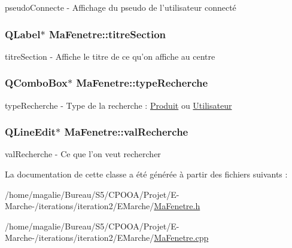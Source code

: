 pseudo\-Connecte -\/ Affichage du pseudo de l'utilisateur connecté 

\hypertarget{class_ma_fenetre_ac4749f9608f7c8d6e5d60434ddbedfc5}{
\subsubsection[{titre\-Section}]{\setlength{\rightskip}{0pt plus 5cm}Q\-Label$\ast$ Ma\-Fenetre\-::titre\-Section\hspace{0.3cm}{\ttfamily [protected]}}}\label{class_ma_fenetre_ac4749f9608f7c8d6e5d60434ddbedfc5}


titre\-Section -\/ Affiche le titre de ce qu'on affiche au centre 

\hypertarget{class_ma_fenetre_a3df6a320b8835369da88bf94b701ae76}{
\subsubsection[{type\-Recherche}]{\setlength{\rightskip}{0pt plus 5cm}Q\-Combo\-Box$\ast$ Ma\-Fenetre\-::type\-Recherche\hspace{0.3cm}{\ttfamily [protected]}}}\label{class_ma_fenetre_a3df6a320b8835369da88bf94b701ae76}


type\-Recherche -\/ Type de la recherche \-: \hyperlink{class_produit}{Produit} ou \hyperlink{class_utilisateur}{Utilisateur} 

\hypertarget{class_ma_fenetre_a37836681a6d48a32dcd379b11447f579}{
\subsubsection[{val\-Recherche}]{\setlength{\rightskip}{0pt plus 5cm}Q\-Line\-Edit$\ast$ Ma\-Fenetre\-::val\-Recherche\hspace{0.3cm}{\ttfamily [protected]}}}\label{class_ma_fenetre_a37836681a6d48a32dcd379b11447f579}


val\-Recherche -\/ Ce que l'on veut rechercher 



La documentation de cette classe a été générée à partir des fichiers suivants \-:\begin{DoxyCompactItemize}
\item 
/home/magalie/\-Bureau/\-S5/\-C\-P\-O\-O\-A/\-Projet/\-E-\/\-Marche-\//iterations/iteration2/\-E\-Marche/\hyperlink{_ma_fenetre_8h}{Ma\-Fenetre.\-h}\item 
/home/magalie/\-Bureau/\-S5/\-C\-P\-O\-O\-A/\-Projet/\-E-\/\-Marche-\//iterations/iteration2/\-E\-Marche/\hyperlink{_ma_fenetre_8cpp}{Ma\-Fenetre.\-cpp}\end{DoxyCompactItemize}
